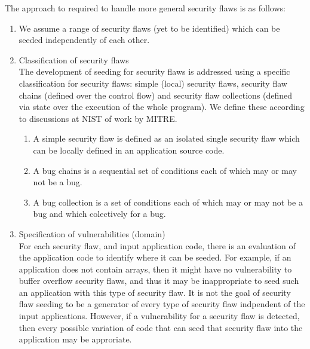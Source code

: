 The approach to required to handle more general security flaws is as follows:
\begin{enumerate}
   \item We assume a range of security flaws (yet to be identified) 
         which can be seeded independently of each other.

   \item Classification of security flaws \\ 
         The development of seeding for security flaws is addressed using a specific 
         classification for security flaws: simple (local) security flaws, 
         security flaw chains (defined over the control flow) and security flaw
         collections (defined via state over the execution of the whole program).  
         We define these according to discussions at NIST of work by MITRE.
      \begin{enumerate}
         \item A simple security flaw is defined as an isolated single security flaw
               which can be locally defined in an application source code.
         \item A bug chains is a sequential set of conditions each of which 
               may or may not be a bug.
         \item A bug collection is a set of conditions each of which may or 
               may not be a bug and which colectively for a bug.
      \end{enumerate}

   \item Specification of vulnerabilities (domain) \\
         For each security flaw, and input application code, there is an evaluation of
         the application code to identify where it can be seeded.  For example, if
         an application does not contain arrays, then it might have no vulnerability
         to buffer overflow security flaws, and thus it may be inappropriate to seed 
         such an application with this type of security flaw.  It is not the goal
         of security flaw seeding to be a generator of every type of security flaw
         indpendent of the input applications.  However, if a vulnerability for a
         security flaw is detected, then every possible variation of code that
         can seed that security flaw into the application may be approriate.


\end{enumerate}
